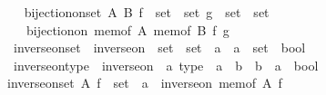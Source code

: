 \begin{isabellebody}
\isanewline
\ \ \isamarkupfalse%
\ {\isachardoublequoteopen}bijection{\isacharunderscore}{\kern0pt}on{\isacharunderscore}{\kern0pt}set\ A\ B\ {\isacharparenleft}{\kern0pt}f\ {\isacharcolon}{\kern0pt}{\isacharcolon}{\kern0pt}\ set\ {\isasymRightarrow}\ set{\isacharparenright}{\kern0pt}\ {\isacharparenleft}{\kern0pt}g\ {\isacharcolon}{\kern0pt}{\isacharcolon}{\kern0pt}\ set\ {\isasymRightarrow}\ set{\isacharparenright}{\kern0pt}\ {\isasymequiv}\isanewline
\ \ \ \ bijection{\isacharunderscore}{\kern0pt}on\ {\isacharparenleft}{\kern0pt}mem{\isacharunderscore}{\kern0pt}of\ A{\isacharparenright}{\kern0pt}\ {\isacharparenleft}{\kern0pt}mem{\isacharunderscore}{\kern0pt}of\ B{\isacharparenright}{\kern0pt}\ f\ g{\isachardoublequoteclose}\isanewline
{}\isamarkupfalse%
\isanewline
\isanewline
\isanewline
{}\isamarkupfalse%
\isanewline
\ \ inverse{\isacharunderscore}{\kern0pt}on{\isacharunderscore}{\kern0pt}set\ {\isasymequiv}\ {\isachardoublequoteopen}inverse{\isacharunderscore}{\kern0pt}on\ {\isacharcolon}{\kern0pt}{\isacharcolon}{\kern0pt}\ set\ {\isasymRightarrow}\ {\isacharparenleft}{\kern0pt}set\ {\isasymRightarrow}\ {\isacharprime}{\kern0pt}a{\isacharparenright}{\kern0pt}\ {\isasymRightarrow}\ {\isacharparenleft}{\kern0pt}{\isacharprime}{\kern0pt}a\ {\isasymRightarrow}\ set{\isacharparenright}{\kern0pt}\ {\isasymRightarrow}\ bool{\isachardoublequoteclose}\isanewline
\ \ inverse{\isacharunderscore}{\kern0pt}on{\isacharunderscore}{\kern0pt}type\ {\isasymequiv}\ {\isachardoublequoteopen}inverse{\isacharunderscore}{\kern0pt}on\ {\isacharcolon}{\kern0pt}{\isacharcolon}{\kern0pt}\ {\isacharprime}{\kern0pt}a\ type\ {\isasymRightarrow}\ {\isacharparenleft}{\kern0pt}{\isacharprime}{\kern0pt}a\ {\isasymRightarrow}\ {\isacharprime}{\kern0pt}b{\isacharparenright}{\kern0pt}\ {\isasymRightarrow}\ {\isacharparenleft}{\kern0pt}{\isacharprime}{\kern0pt}b\ {\isasymRightarrow}\ {\isacharprime}{\kern0pt}a{\isacharparenright}{\kern0pt}\ {\isasymRightarrow}\ bool{\isachardoublequoteclose}\isanewline
{}\isanewline
\ \ \isamarkupfalse%
\ {\isachardoublequoteopen}inverse{\isacharunderscore}{\kern0pt}on{\isacharunderscore}{\kern0pt}set\ A\ {\isacharparenleft}{\kern0pt}f\ {\isacharcolon}{\kern0pt}{\isacharcolon}{\kern0pt}\ set\ {\isasymRightarrow}\ {\isacharprime}{\kern0pt}a{\isacharparenright}{\kern0pt}\ {\isasymequiv}\ inverse{\isacharunderscore}{\kern0pt}on\ {\isacharparenleft}{\kern0pt}mem{\isacharunderscore}{\kern0pt}of\ A{\isacharparenright}{\kern0pt}\ f{\isachardoublequoteclose}\isanewline

\end{isabellebody}
